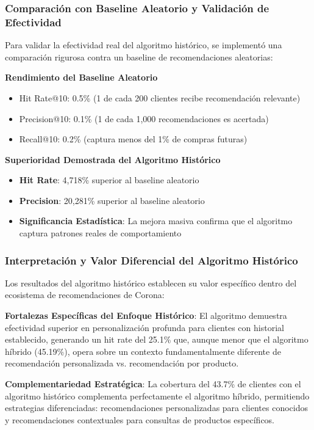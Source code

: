 \documentclass[twocolumn]{article}
\begin{document}
\subsubsection{Comparación con Baseline Aleatorio y Validación de Efectividad}

Para validar la efectividad real del algoritmo histórico, se implementó una comparación rigurosa contra un baseline de recomendaciones aleatorias:

\textbf{Rendimiento del Baseline Aleatorio}
\begin{itemize}
    \item Hit Rate@10: 0.5\% (1 de cada 200 clientes recibe recomendación relevante)
    \item Precision@10: 0.1\% (1 de cada 1,000 recomendaciones es acertada)
    \item Recall@10: 0.2\% (captura menos del 1\% de compras futuras)
\end{itemize}

\textbf{Superioridad Demostrada del Algoritmo Histórico}
\begin{itemize}
    \item \textbf{Hit Rate}: 4,718\% superior al baseline aleatorio
    \item \textbf{Precision}: 20,281\% superior al baseline aleatorio
    \item \textbf{Significancia Estadística}: La mejora masiva confirma que el algoritmo captura patrones reales de comportamiento
\end{itemize}

\subsubsection{Interpretación y Valor Diferencial del Algoritmo Histórico}

Los resultados del algoritmo histórico establecen su valor específico dentro del ecosistema de recomendaciones de Corona:

\textbf{Fortalezas Específicas del Enfoque Histórico}: El algoritmo demuestra efectividad superior en personalización profunda para clientes con historial establecido, generando un hit rate del 25.1\% que, aunque menor que el algoritmo híbrido (45.19\%), opera sobre un contexto fundamentalmente diferente de recomendación personalizada vs. recomendación por producto.

\textbf{Complementariedad Estratégica}: La cobertura del 43.7\% de clientes con el algoritmo histórico complementa perfectamente el algoritmo híbrido, permitiendo estrategias diferenciadas: recomendaciones personalizadas para clientes conocidos y recomendaciones contextuales para consultas de productos específicos.
\end{document}
